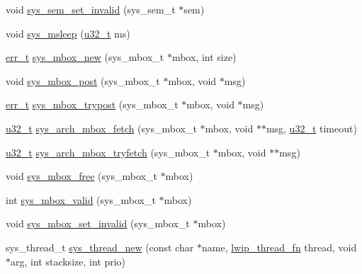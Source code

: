 \begin{DoxyCompactItemize}
\item 
void \hyperlink{group__sys__sem_ga42a2ab32afbf41a4146a9d135224ef33}{sys\+\_\+sem\+\_\+set\+\_\+invalid} (sys\+\_\+sem\+\_\+t $\ast$sem)
\item 
void \hyperlink{group__sys__misc_ga6b8786f43e779953e8b74e983c88682e}{sys\+\_\+msleep} (\hyperlink{group__compiler__abstraction_ga4c14294869aceba3ef9d4c0c302d0f33}{u32\+\_\+t} ms)
\item 
\hyperlink{group__infrastructure__errors_gaf02d9da80fd66b4f986d2c53d7231ddb}{err\+\_\+t} \hyperlink{group__sys__mbox_gab9793f30642de06ce87827e9adbe30cc}{sys\+\_\+mbox\+\_\+new} (sys\+\_\+mbox\+\_\+t $\ast$mbox, int size)
\item 
void \hyperlink{group__sys__mbox_ga9d068386a3c53dd01b8af99c3ef77555}{sys\+\_\+mbox\+\_\+post} (sys\+\_\+mbox\+\_\+t $\ast$mbox, void $\ast$msg)
\item 
\hyperlink{group__infrastructure__errors_gaf02d9da80fd66b4f986d2c53d7231ddb}{err\+\_\+t} \hyperlink{group__sys__mbox_gaa36345e48a49d67cbb0878cd4cbd2195}{sys\+\_\+mbox\+\_\+trypost} (sys\+\_\+mbox\+\_\+t $\ast$mbox, void $\ast$msg)
\item 
\hyperlink{group__compiler__abstraction_ga4c14294869aceba3ef9d4c0c302d0f33}{u32\+\_\+t} \hyperlink{group__sys__mbox_ga6464cd77cf6799bd8b3d6c840166a2e8}{sys\+\_\+arch\+\_\+mbox\+\_\+fetch} (sys\+\_\+mbox\+\_\+t $\ast$mbox, void $\ast$$\ast$msg, \hyperlink{group__compiler__abstraction_ga4c14294869aceba3ef9d4c0c302d0f33}{u32\+\_\+t} timeout)
\item 
\hyperlink{group__compiler__abstraction_ga4c14294869aceba3ef9d4c0c302d0f33}{u32\+\_\+t} \hyperlink{group__sys__mbox_gafab441b130b4ec417012835dbe1e497c}{sys\+\_\+arch\+\_\+mbox\+\_\+tryfetch} (sys\+\_\+mbox\+\_\+t $\ast$mbox, void $\ast$$\ast$msg)
\item 
void \hyperlink{group__sys__mbox_gac641a45812155d2234ef80dd6412882f}{sys\+\_\+mbox\+\_\+free} (sys\+\_\+mbox\+\_\+t $\ast$mbox)
\item 
int \hyperlink{group__sys__mbox_ga8bcfab4bd791dd33f69a778e7585275d}{sys\+\_\+mbox\+\_\+valid} (sys\+\_\+mbox\+\_\+t $\ast$mbox)
\item 
void \hyperlink{group__sys__mbox_ga53ddec9d7f5500c5b1d982cd17493172}{sys\+\_\+mbox\+\_\+set\+\_\+invalid} (sys\+\_\+mbox\+\_\+t $\ast$mbox)
\item 
sys\+\_\+thread\+\_\+t \hyperlink{group__sys__misc_ga0d596afdd8dbcfad320172d39b0f607a}{sys\+\_\+thread\+\_\+new} (const char $\ast$name, \hyperlink{openmote-cc2538_2lwip_2src_2include_2lwip_2sys_8h_ae30a77bf6bd69bfcc5f235eaad54f2b9}{lwip\+\_\+thread\+\_\+fn} thread, void $\ast$arg, int stacksize, int prio)

\end{DoxyCompactItemize}
